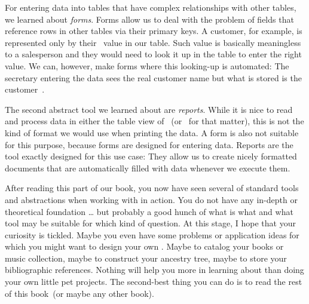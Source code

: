 For entering data into tables that have complex relationships with other tables, we learned about \emph{forms}.
Forms allow us to deal with the problem of fields that reference rows in other tables via their primary keys.
A customer, for example, is represented only by their ~value in our  table.
Such value is basically meaningless to a salesperson and they would need to look it up in the  table to enter the right value.
We can, however, make forms where this looking-up is automated:
The secretary entering the data sees the real customer name but what is stored is the customer~.

The second abstract tool we learned about are \emph{reports}.
While it is nice to read and process data in either the table view of \libreofficeBase~(or \microsoftAccess\ for that matter), this is not the kind of format we would use when printing the data.
A form is also not suitable for this purpose, because forms are designed for entering data.
Reports are the tool exactly designed for this use case:
They allow us to create nicely formatted documents that are automatically filled with data whenever we execute them.

After reading this part of our book, you now have seen several of standard tools and abstractions when working with  in action.
You do not have any in-depth or theoretical foundation {\dots} but probably a good hunch of what is what and what tool may be suitable for which kind of question.
At this stage, I hope that your curiosity is tickled.
Maybe you even have some problems or application ideas for which you might want to design your own \db.
Maybe to catalog your books or music collection, maybe to construct your ancestry tree, maybe to store your bibliographic references.
Nothing will help you more in learning about  than doing your own little pet projects.
The second-best thing you can do is to read the rest of this book~(or maybe any other book).%
%
\endhsection%
%
